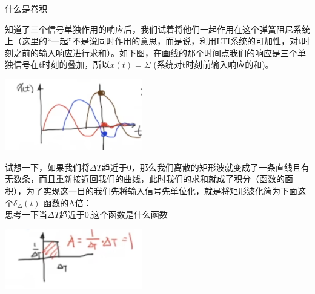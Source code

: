\documentclass[UTF8,a4paper,12pt]{ctexart}
\begin{document}
\begin{flushleft}
\begin{titlebox}{什么是卷积}
\begin{center}
      \end{center}
      知道了三个信号单独作用的响应后，我们试着将他们一起作用在这个弹簧阻尼系统上（这里的“一起”不是说同时作用的意思，而是说，利用LTI系统的可加性，对t时刻之前的输入响应进行求和）。如下图，在画线的那个时间点我们的响应是三个单独信号在t时刻的叠加，所以$x(t)=\varSigma$ {\scriptsize (系统对t时刻前输入响应的和)}。
      \begin{center}
        \par \includegraphics[width=6cm]{picture/juanji_5.png}
      \end{center}
      试想一下，如果我们将$\varDelta T$趋近于0，那么我们离散的矩形波就变成了一条直线且有无数条，而且重新接近回我们的曲线，此时我们的求和就成了积分（函数的面积），为了实现这一目的我们先将输入信号先单位化，就是将矩形波化简为下面这个$\delta _{\varDelta}(t)$ 函数的A倍：\\{\scriptsize 思考一下当$\varDelta T$趋近于0,这个函数是什么函数}
      \begin{center}
        \par \includegraphics[width=6cm]{picture/juanji_6.png}
      \end{center}


\end{titlebox}
\end{flushleft}
\end{document}

